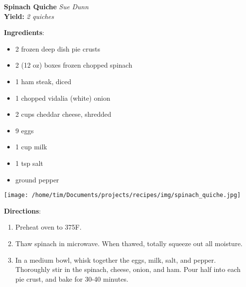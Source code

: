 \documentclass[11pt, twoside, openany]{book}
\begin{document}
\noindent\begin{minipage}[t]{\linewidth}%
{\Large\textbf{Spinach Quiche}} \label{spinach-quiche}\hfill\textit{Sue Dunn}\\
\textbf{Yield:} \textit{2 quiches}\\
\noindent\begin{minipage}[t]{0.78\linewidth}%
\textbf{Ingredients}:\vspace{-3mm}
\begin{multicols}{2}
\begin{itemize}\setlength\itemsep{-1mm}
\item 2 frozen deep dish pie crusts
\item 2 (12 oz) boxes frozen chopped spinach
\item 1 ham steak, diced
\item 1 chopped vidalia (white) onion
\item 2 cups cheddar cheese, shredded
\item 9 eggs
\item 1 cup milk
\item 1 tsp salt
\item ground pepper
\end{itemize}
\end{multicols}
\end{minipage}
\noindent\begin{minipage}[t]{0.18\linewidth}
\centering \strut\vspace*{-\baselineskip}\newline
\texttt{[image: /home/tim/Documents/projects/recipes/img/spinach\_quiche.jpg]}\\
\end{minipage}\vspace{3mm}
\textbf{Directions}:
\vspace{-3mm}\begin{enumerate}\setlength\itemsep{-1mm}
\item Preheat oven to 375F.
\item Thaw spinach in microwave. When thawed, totally squeeze out all moisture.
\item In a medium bowl, whisk together the eggs, milk, salt, and pepper. Thoroughly stir in the spinach, cheese, onion, and ham. Pour half into each pie crust, and bake for 30-40 minutes.
\end{enumerate}
\end{minipage}\vspace{8mm}
\end{document}
